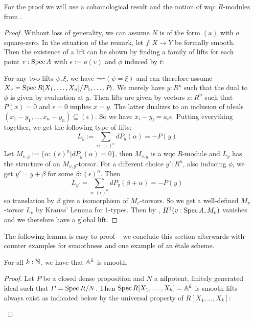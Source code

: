 For the proof we will use a cohomological result and the notion of wqc $R$-modules from \cite{draft}.
\begin{proof}
  Without loss of generality, we can assume $N$ is of the form $(a)$ with $a$ square-zero.
  In the situation of the remark, let $f:X\to Y$ be formally smooth.
  Then the existence of a lift can be shown
  by finding a family of lifts for each point $v:\operatorname{Spec} A$ with $\epsilon:=a(v)$ and $\phi$ induced by $t$:
  \begin{center}
  \end{center}
  For any two lifts $\psi,\xi$, we have $\neg\neg(\psi=\xi)$
  and can therefore assume $X_v=\operatorname{Spec} R[X_1,\dots,X_n]/P_1,\dots,P_l$.
  We merely have $y:R^n$ such that the dual to $\phi$ is given by evaluation at $y$.
  Then lifts are given by vectors $x:R^n$ such that $P(x)=0$ and $\epsilon = 0$ implies $x=y$.
  The latter dualizes to an inclusion of ideals $(x_1-y_1,\dots,x_n-y_n)\subseteq (\epsilon)$.
  So we have $x_i-y_i=a_i\epsilon$.
  Putting everything together, we get the following type of lifts:
  \[L_y:=\sum_{\alpha:(\epsilon)^n}dP_y(\alpha)=-P(y) \]
  Let $M_{v,y}:=\{\alpha:(\epsilon)^n\vert dP_y(\alpha)=0\}$, then  $M_{v,y}$ is a wqc $R$-module and $L_y$ has the structure of an $M_{v,y}$-torsor.
  For a different choice $y':R^n$, also inducing $\phi$, we get $y'=y+\beta$ for some $\beta:(\epsilon)^n$.
  Then
  \[L_{y'}=\sum_{\alpha:(\epsilon)^n}dP_y(\beta+\alpha)=-P(y)\]
  so translation by $\beta$ give a isomorphism of $M_v$-torsors.
  So we get a well-defined $M_v$-torsor $L_v$ by Krauss' Lemma for 1-types.
  Then by \cite{draft}, $H^1(v:\operatorname{Spec} A, M_v)$ vanishes and we therefore have a global lift. 
\end{proof}

The following lemma is easy to proof -- we conclude this section afterwards with counter examples for smoothness and one example of an étale scheme.

\begin{lemma}\label{An-is-smooth}
For all $k:\mathbb{N}$, we have that $\mathbb{A}^k$ is smooth.
\end{lemma}

\begin{proof}
  Let $P$ be a closed dense proposition and $N$ a nilpotent, finitely generated ideal such that $P=\operatorname{Spec} R/N$.
  Then $\operatorname{Spec} R[X_1,\dots,X_k]=\mathbb{A}^k$ is smooth lifts always exist as indicated below by the universal property of $R[X_1,\dots,X_k]$:
  \begin{center}
  \end{center}
\end{proof}

